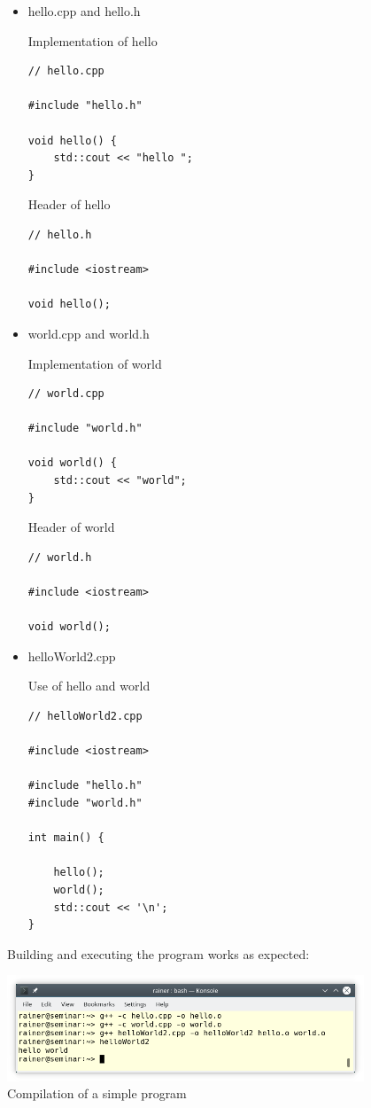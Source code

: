 \begin{itemize}
\item 
hello.cpp and hello.h

\noindent
Implementation of hello
\begin{lstlisting}[style=styleCXX]
// hello.cpp

#include "hello.h"

void hello() {
	std::cout << "hello ";
}
\end{lstlisting}

\noindent
Header of hello
\begin{lstlisting}[style=styleCXX]
// hello.h

#include <iostream>

void hello();
\end{lstlisting}

\item 
world.cpp and world.h

\noindent
Implementation of world
\begin{lstlisting}[style=styleCXX]
// world.cpp

#include "world.h"

void world() {
	std::cout << "world";
}
\end{lstlisting}

\noindent
Header of world
\begin{lstlisting}[style=styleCXX]
// world.h

#include <iostream>

void world();
\end{lstlisting}

\item 
helloWorld2.cpp

\noindent
Use of hello and world
\begin{lstlisting}[style=styleCXX]
// helloWorld2.cpp

#include <iostream>

#include "hello.h"
#include "world.h"

int main() {
	
	hello();
	world();
	std::cout << '\n';
}
\end{lstlisting}


\end{itemize}

Building and executing the program works as expected:

\begin{center}
\includegraphics[width=0.8\textwidth]{content/3/chapter4/images/14.png}\\
Compilation of a simple program
\end{center}


